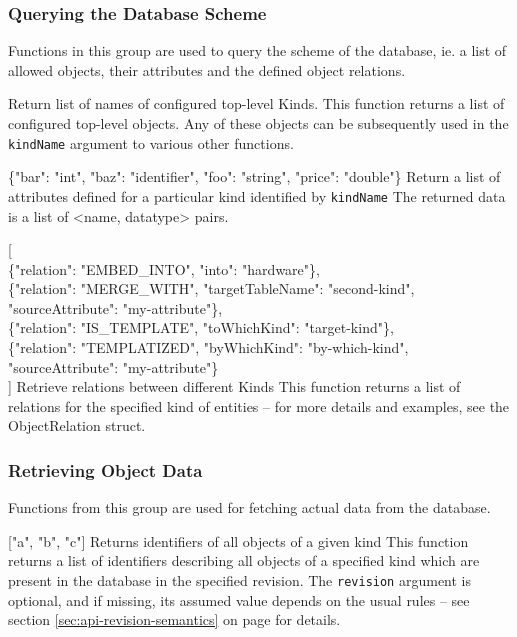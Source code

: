\documentclass{article}
\begin{document}
\subsubsection{Querying the Database Scheme}
\label{sec:api-group-dbscheme}

Functions in this group are used to query the scheme of the database, ie. a list of allowed objects, their attributes
and the defined object relations.

    {Return list of names of configured top-level Kinds.}
    {This function returns a list of configured top-level objects.  Any of these objects can be subsequently used in the
    {\tt kindName} argument to various other functions.}

    {\{"bar": "int", "baz": "identifier", "foo": "string", "price": "double"\}}
    {Return a list of attributes defined for a particular kind identified by {\tt kindName}}
    {The returned data is a list of \textless name, datatype\textgreater { }pairs.}

    { [ \\
            \{"relation": "EMBED\_INTO", "into": "hardware"\}, \\
            \{"relation": "MERGE\_WITH", "targetTableName": "second-kind", "sourceAttribute": "my-attribute"\}, \\
            \{"relation": "IS\_TEMPLATE", "toWhichKind": "target-kind"\}, \\
            \{"relation": "TEMPLATIZED", "byWhichKind": "by-which-kind", "sourceAttribute": "my-attribute"\} \\
            ]}
    {Retrieve relations between different Kinds}
    {This function returns a list of relations for the specified kind of entities -- for more details and examples, see the ObjectRelation struct.}

\subsubsection{Retrieving Object Data}
\label{sec:api-group-data-retrieval}

Functions from this group are used for fetching actual data from the database.

    { ["a", "b", "c"] }
    {Returns identifiers of all objects of a given kind}
    {This function returns a list of identifiers describing all objects of a specified kind which are present in the
    database in the specified revision.  The {\tt revision} argument is optional, and if missing, its assumed value
    depends on the usual rules -- see section \ref{sec:api-revision-semantics} on page
    \pageref{sec:api-revision-semantics} for details.}
\end{document}
